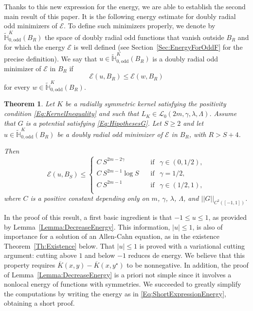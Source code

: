 \documentclass[12pt,reqno]{amsart}
\newtheorem{theorem}{Theorem}[section]
\theoremstyle{definition}
\theoremstyle{remark}
\newcommand{\con}[1]{\mathbb{#1}}
\renewcommand{\H}{\con{H}}
\newcommand{\ecal}{\mathcal{E}}
\newcommand{\lcal}{\mathcal{L}}
\newcommand{\norm}[1]{\left | \left |{#1} \right | \right |}
\newcommand{\s}{\gamma}
\numberwithin{equation}{section}
\begin{document}
	
	
	Thanks to this new expression for the energy, we are able to establish the second main result of this paper. It is the following energy estimate for doubly radial odd minimizers of $\ecal$. To define such minimizers properly, we denote by $\widetilde{\H}^K_{0, \mathrm{odd}}(B_R)$ the space of doubly radial odd functions that vanish outside $B_R$ and for which the energy $\ecal$ is well defined (see Section~\ref{Sec:EnergyForOddF} for the precise definition). We say that $u\in \widetilde{\H}^K_{0, \mathrm{odd}}(B_R)$ is a doubly radial odd minimizer of $\ecal$ in $B_R$ if
	$$
	\ecal(u,B_R) \leq \ecal (w,B_R)
	$$
	for every $w\in \widetilde{\H}^K_{0, \mathrm{odd}}(B_R)$. 
	
	\begin{theorem}
		\label{Th:EnergyEstimate} 
		Let $K$ be a radially symmetric kernel satisfying the positivity condition \eqref{Eq:KernelInequality} and such that $L_K\in \lcal_0(2m, \s, \lambda, \Lambda)$. Assume that $G$ is a potential satisfying \eqref{Eq:HipothesesG}. Let $S\geq2$ and let $u\in \widetilde{\H}^K_{0, \mathrm{odd}}(B_R)$ be a doubly radial odd minimizer of $\ecal$ in $B_R$, with $R>S+4$. 
		
		Then
		\begin{equation}
		\label{Eq:EnergyEstimate} 
		\ecal (u,B_S) \leq 
		\begin{cases}
		C \ S^{2m-2\s}\ \ \ \ &\textrm{if } \ \ \s\in(0,1/2),\\
		C \ S^{2m-1} \log S\ \ \ \ &\textrm{if } \ \ \s=1/2,\\
		C \ S^{2m-1}\ \ \ \ &\textrm{if } \ \ \s\in(1/2,1),\\
		\end{cases}
		\end{equation}
		where $C$ is a positive constant depending only on $m$, $\s$, $\lambda$, $\Lambda$, and $\norm{G}_{C^2([-1,1])}$.
	\end{theorem}
	
	
	In the proof of this result, a first basic ingredient is that $-1\leq u\leq 1$, as provided by Lemma~\ref{Lemma:DecreaseEnergy}. This information, $|u|\leq 1$, is also of importance for a solution of an Allen-Cahn equation, as in the existence Theorem~\ref{Th:Existence} below. That $|u|\leq 1$ is proved with a variational cutting argument: cutting above $1$ and below $-1$ reduces de energy. We believe that this property requires $\overline{K}(x,y)- \overline{K}(x,y^\star)$ to be nonnegative. In addition, the proof of Lemma~\ref{Lemma:DecreaseEnergy} is a priori not simple since it involves a nonlocal energy of functions with symmetries. We succeeded to greatly simplify the computations by writing the energy as in \eqref{Eq:ShortExpressionEnergy}, obtaining a short proof.
	
\end{document}
